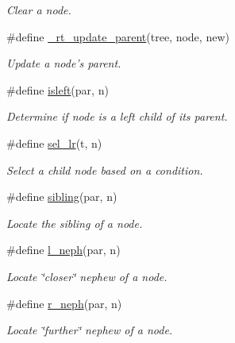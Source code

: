 \begin{CompactItemize}
\begin{CompactList}\small\item\em Clear a node. \item\end{CompactList}\item 
\#define \hyperlink{group__dbprim__rbtree_ga46}{\_\-rt\_\-update\_\-parent}(tree, node, new)
\begin{CompactList}\small\item\em Update a node's parent. \item\end{CompactList}\item 
\#define \hyperlink{group__dbprim__rbtree_ga47}{isleft}(par, n)
\begin{CompactList}\small\item\em Determine if node is a left child of its parent. \item\end{CompactList}\item 
\#define \hyperlink{group__dbprim__rbtree_ga48}{sel\_\-lr}(t, n)
\begin{CompactList}\small\item\em Select a child node based on a condition. \item\end{CompactList}\item 
\#define \hyperlink{group__dbprim__rbtree_ga49}{sibling}(par, n)
\begin{CompactList}\small\item\em Locate the sibling of a node. \item\end{CompactList}\item 
\#define \hyperlink{group__dbprim__rbtree_ga50}{l\_\-neph}(par, n)
\begin{CompactList}\small\item\em Locate \char`\"{}closer\char`\"{} nephew of a node. \item\end{CompactList}\item 
\#define \hyperlink{group__dbprim__rbtree_ga51}{r\_\-neph}(par, n)
\begin{CompactList}\small\item\em Locate \char`\"{}further\char`\"{} nephew of a node. \item\end{CompactList}\end{CompactItemize}
